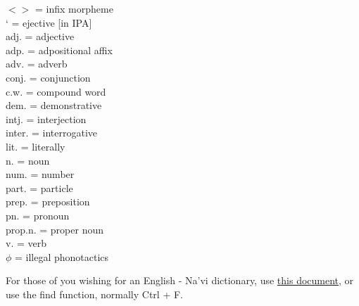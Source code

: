 \documentclass[11pt]{article}
\begin{document}
$$\begin{multicols}{2}
{$< >$ = infix morpheme\\
` = ejective [in IPA]\\
adj. = adjective\\
adp. = adpositional affix\\
adv. = adverb\\
conj. = conjunction\\
c.w. = compound word\\
dem. = demonstrative\\
intj. = interjection\\
inter. = interrogative\\
lit. = literally\\
n. = noun\\
num. = number\\
part. = particle\\
prep. = preposition\\
pn. = pronoun\\
prop.n. = proper noun\\
v. = verb\\
$\phi$ = illegal phonotactics}
\end{multicols}
For those of you wishing for an English - Na'vi dictionary, use \href{http://content.learnnavi.org/taronyu/NaviEnglish.pdf}{this document}, or use the find function, normally Ctrl + F. 
\end{document}
